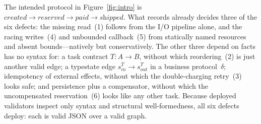 \label{sec:bg:defects}

The intended protocol in Figure~\ref{fig:intro} is
$\textit{created} \to \textit{reserved} \to \textit{paid} \to
\textit{shipped}$. What \asl{} records already decides three of the six
defects: the missing read~(1) follows from the I/O pipeline alone, and
the racing writes~(4) and unbounded callback~(5) from statically named
resources and absent bounds---natively but conservatively. The other
three depend on facts \asl{} has no syntax for: a task contract
$T : A \to B$, without which reordering~(2) is just another valid edge;
a typestate edge $s^{T}_{\mathit{in}} \to s^{T}_{\mathit{out}}$ in a
business protocol~$\delta$; idempotency of external effects, without
which the double-charging retry~(3) looks safe; and persistence plus a
compensator, without which the uncompensated reservation~(6) looks like
any other task.
Because deployed validators inspect only syntax and structural
well-formedness, all six defects deploy: each is valid JSON over a
valid graph.


